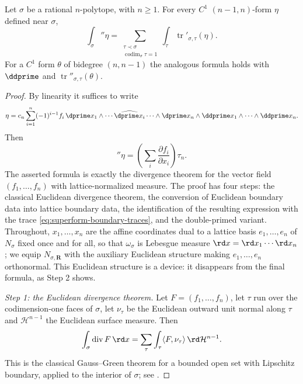 \begin{theorem}\label{thm:polyhedral-stokes}
Let $\sigma$ be a rational $n$-polytope, with $n\ge1$. For every $C^1$
$(n-1,n)$-form $\eta$ defined near $\sigma$,
\[
                         \int_\sigma \dprime\eta
          =\sum_{\substack{\tau\prec\sigma\\
                           \operatorname{codim}_\sigma\tau=1}}\int_\tau
             \operatorname{tr}'_{\sigma,\tau}(\eta).
\]
For a $C^1$ form $\theta$ of bidegree $(n,n-1)$ the analogous formula
holds with $\ddprime$ and
$\operatorname{tr}''_{\sigma,\tau}(\theta)$.
\end{theorem}
\begin{proof}
By linearity it suffices to write
\[
\eta=c_n\sum_{i=1}^n(-1)^{i-1}f_i\,
\dprime x_1\wedge\cdots\widehat{\dprime x_i}\cdots\wedge \dprime x_n
\wedge \ddprime x_1\wedge\cdots\wedge \ddprime x_n.
\]
Then
\[
\dprime\eta=\left(\sum_i\frac{\partial f_i}{\partial x_i}\right)\tau_n.
\]
The asserted formula is exactly the divergence theorem for the vector field
$(f_1,\ldots,f_n)$ with lattice-normalized measure.  The proof has four
steps: the classical Euclidean divergence theorem, the conversion of
Euclidean boundary data into lattice boundary data, the identification of
the resulting expression with the trace
\eqref{eq:superform-boundary-traces}, and the double-primed variant.  Throughout, $x_1,\ldots,x_n$ are the
affine coordinates dual to a lattice basis $e_1,\ldots,e_n$ of $N_\sigma$
fixed once and for all, so that $\omega_\sigma$ is Lebesgue measure
$\rd x=\rd x_1\cdots\rd x_n$; we equip $N_{\sigma,\mathbf R}$ with the
auxiliary Euclidean structure making $e_1,\ldots,e_n$ orthonormal.  This
Euclidean structure is a device: it disappears from the final formula, as
Step 2 shows.

\smallskip
\emph{Step 1: the Euclidean divergence theorem.}
Let $F=(f_1,\ldots,f_n)$, let $\tau$ run over the codimension-one faces of
$\sigma$, let $\nu_\tau$ be the Euclidean outward unit normal along $\tau$
and $\mathcal H^{n-1}$ the Euclidean surface measure.  Then
\begin{equation}
\label{eq:ch11-euclidean-divergence}
 \int_\sigma\operatorname{div}F\,\rd x
 =\sum_\tau\int_\tau\langle F,\nu_\tau\rangle\,\rd\mathcal H^{n-1}.
\end{equation}
This is the classical Gauss--Green theorem for a bounded open set with
Lipschitz boundary, applied to the interior of $\sigma$; see
\cite[\S5.8]{EvansGariepy}.


\end{proof}

